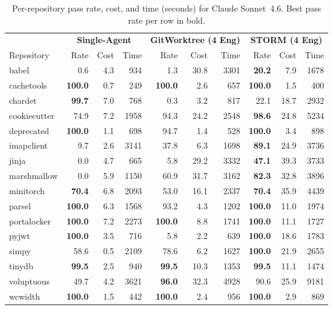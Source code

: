 \documentclass{article}
\begin{document}
\begin{table}[t!]
  \caption{Per-repository pass rate, cost, and time (seconds) for Claude Sonnet~4.6. Best pass rate per row in bold.}
  \label{tab:per-repo}
  \centering
  \small
  \begin{tabular}{l rrr rrr rrr}
    \toprule
    & \multicolumn{3}{c}{\textbf{Single-Agent}} & \multicolumn{3}{c}{\textbf{GitWorktree (4 Eng)}} & \multicolumn{3}{c}{\textbf{STORM (4 Eng)}} \\
    \cmidrule(lr){2-4} \cmidrule(lr){5-7} \cmidrule(lr){8-10}
    Repository & Rate & Cost & Time & Rate & Cost & Time & Rate & Cost & Time \\
    \midrule
    babel        &   0.6 &  4.3 &  934 &   1.3 & 30.8 & 3301 & \textbf{20.2} &  7.9 & 1678 \\
    cachetools   & \textbf{100.0} &  0.7 &  249 & \textbf{100.0} &  2.6 &  657 & \textbf{100.0} &  1.5 &  400 \\
    chardet      & \textbf{99.7} &  7.0 &  768 &   0.3 &  3.2 &  817 &  22.1 & 18.7 & 2932 \\
    cookiecutter &  74.9 &  7.2 & 1958 &  94.3 & 24.2 & 2548 & \textbf{98.6} & 24.8 & 5234 \\
    deprecated   & \textbf{100.0} &  1.1 &  698 &  94.7 &  1.4 &  528 & \textbf{100.0} &  3.4 &  898 \\
    imapclient   &   9.7 &  2.6 & 3141 &  37.8 &  6.3 & 1698 & \textbf{89.1} & 24.9 & 3736 \\
    jinja        &   0.0 &  4.7 &  665 &   5.8 & 29.2 & 3332 & \textbf{47.1} & 39.3 & 3733 \\
    marshmallow  &   0.0 &  5.9 & 1150 &  60.9 & 31.7 & 3162 & \textbf{82.3} & 32.8 & 3896 \\
    minitorch    & \textbf{70.4} &  6.8 & 2093 &  53.0 & 16.1 & 2337 & \textbf{70.4} & 35.9 & 4439 \\
    parsel       & \textbf{100.0} &  6.3 & 1568 &  93.2 &  4.3 & 1202 & \textbf{100.0} & 11.0 & 1974 \\
    portalocker  & \textbf{100.0} &  7.2 & 2273 & \textbf{100.0} &  8.8 & 1741 & \textbf{100.0} & 11.1 & 1727 \\
    pyjwt        & \textbf{100.0} &  3.5 &  716 &   5.8 &  2.2 &  639 & \textbf{100.0} & 18.6 & 1783 \\
    simpy        &  58.6 &  0.5 & 2109 &  78.6 &  6.2 & 1627 & \textbf{100.0} & 21.9 & 2655 \\
    tinydb       & \textbf{99.5} &  2.5 &  940 & \textbf{99.5} & 10.3 & 1353 & \textbf{99.5} & 11.1 & 1474 \\
    voluptuous   &  49.7 &  4.2 & 3621 & \textbf{96.0} & 32.3 & 4928 &  90.6 & 25.9 & 9181 \\
    wcwidth      & \textbf{100.0} &  1.5 &  442 & \textbf{100.0} &  2.4 &  956 & \textbf{100.0} &  2.9 &  869 \\
    \bottomrule
  \end{tabular}
\end{table}
\end{document}
